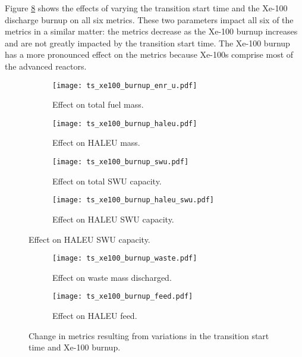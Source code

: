 Figure \ref{fig:ts_xe100_bu} shows the effects of varying the 
transition start time and the Xe-100 discharge burnup on all six 
metrics. These two parameters impact all six of the metrics in 
a similar matter: the metrics decrease as the Xe-100 burnup increases 
and are not greatly impacted by the transition start time. The 
Xe-100 burnup has a more pronounced effect on the metrics because Xe-100s 
comprise most of the advanced reactors. 

\begin{figure}
    \begin{subfigure}[t]{0.48\textwidth}
        \centering
        \texttt{[image: ts\_xe100\_burnup\_enr\_u.pdf]}
        \caption{Effect on total fuel mass.}
        \label{fig:ts_xe100_bu_enr_u}
    \end{subfigure}
    \hfill
    \begin{subfigure}[t]{0.48\textwidth}
        \centering
        \texttt{[image: ts\_xe100\_burnup\_haleu.pdf]}
        \caption{Effect on HALEU mass.}
        \label{fig:ts_xe100_bu_haleu}
    \end{subfigure}
    
    \begin{subfigure}[t]{0.48\textwidth}
        \centering
        \texttt{[image: ts\_xe100\_burnup\_swu.pdf]}
        \caption{Effect on total SWU capacity.}
        \label{fig:ts_xe100_bu_swu}
    \end{subfigure}
    \hfill
    \begin{subfigure}[t]{0.48\textwidth}
        \centering
        \texttt{[image: ts\_xe100\_burnup\_haleu\_swu.pdf]}
        \caption{Effect on HALEU SWU capacity.}
        \label{fig:ts_xe100_bu_haleu_swu}
    \end{subfigure}
\end{figure}

\begin{figure}
    \ContinuedFloat    
    \begin{subfigure}[t]{0.48\textwidth}
        \centering
        \texttt{[image: ts\_xe100\_burnup\_waste.pdf]}
        \caption{Effect on waste mass discharged.}
        \label{fig:ts_xe100_bu_waste}
    \end{subfigure}
    \hfill
    \begin{subfigure}[t]{0.48\textwidth}
        \centering
        \texttt{[image: ts\_xe100\_burnup\_feed.pdf]}
        \caption{Effect on HALEU feed.}
        \label{fig:ts_xe100_bu_feed}
    \end{subfigure}
    \caption{Change in metrics resulting from variations in the 
    transition start time and Xe-100 burnup.}
    \label{fig:ts_xe100_bu}
\end{figure}

